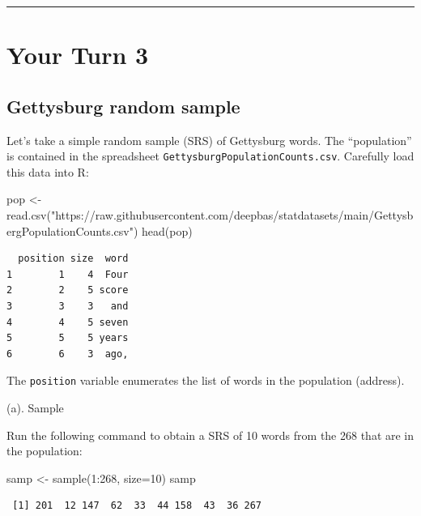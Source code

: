 \documentclass[
]{book}
\newenvironment{Shaded}{\begin{snugshade}}{\end{snugshade}}
\newcommand{\AttributeTok}[1]{\textcolor[rgb]{0.77,0.63,0.00}{#1}}
\newcommand{\DecValTok}[1]{\textcolor[rgb]{0.00,0.00,0.81}{#1}}
\newcommand{\FunctionTok}[1]{\textcolor[rgb]{0.00,0.00,0.00}{#1}}
\newcommand{\NormalTok}[1]{#1}
\newcommand{\OtherTok}[1]{\textcolor[rgb]{0.56,0.35,0.01}{#1}}
\newcommand{\SpecialCharTok}[1]{\textcolor[rgb]{0.00,0.00,0.00}{#1}}
\newcommand{\StringTok}[1]{\textcolor[rgb]{0.31,0.60,0.02}{#1}}
\begin{document}
\begin{center}\rule{0.5\linewidth}{0.5pt}\end{center}

\hypertarget{your-turn-3}{%
\section{Your Turn 3}\label{your-turn-3}}

\hypertarget{gettysburg-random-sample}{%
\subsection{Gettysburg random sample}\label{gettysburg-random-sample}}

Let's take a simple random sample (SRS) of Gettysburg words. The ``population'' is contained in the
spreadsheet \texttt{GettysburgPopulationCounts.csv}. Carefully load this data into R:

\begin{Shaded}
\begin{Highlighting}[]
\NormalTok{pop }\OtherTok{\textless{}{-}} \FunctionTok{read.csv}\NormalTok{(}\StringTok{"https://raw.githubusercontent.com/deepbas/statdatasets/main/GettysbergPopulationCounts.csv"}\NormalTok{)}
\FunctionTok{head}\NormalTok{(pop)}
\end{Highlighting}
\end{Shaded}

\begin{verbatim}
  position size  word
1        1    4  Four
2        2    5 score
3        3    3   and
4        4    5 seven
5        5    5 years
6        6    3  ago,
\end{verbatim}

The \texttt{position} variable enumerates the list of words in the population (address).

(a). Sample

Run the following command to obtain a SRS of 10 words from the 268 that are in the population:

\begin{Shaded}
\begin{Highlighting}[]
\NormalTok{samp }\OtherTok{\textless{}{-}} \FunctionTok{sample}\NormalTok{(}\DecValTok{1}\SpecialCharTok{:}\DecValTok{268}\NormalTok{, }\AttributeTok{size=}\DecValTok{10}\NormalTok{)}
\NormalTok{samp}
\end{Highlighting}
\end{Shaded}

\begin{verbatim}
 [1] 201  12 147  62  33  44 158  43  36 267
\end{verbatim}
\end{document}
